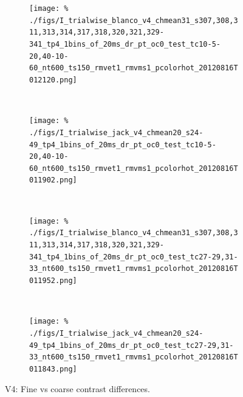 
\begin{figure}[htbp]
    \begin{subfigure}[b]{0.5\linewidth}
        \centering
        \caption{}
        \label{fig:b4-1x20cc}
        \texttt{[image: \%
./figs/I\_trialwise\_blanco\_v4\_chmean31\_s307,308,311,313,314,317,318,320,321,329-341\_tp4\_1bins\_of\_20ms\_dr\_pt\_oc0\_test\_tc10-5-20,40-10-60\_nt600\_ts150\_rmvet1\_rmvms1\_pcolorhot\_20120816T012120.png]}
    \end{subfigure}
    ~~
    \begin{subfigure}[b]{0.5\linewidth}
        \centering
        \caption{}
        \label{fig:j4-1x20cc}
        \texttt{[image: \%
./figs/I\_trialwise\_jack\_v4\_chmean20\_s24-49\_tp4\_1bins\_of\_20ms\_dr\_pt\_oc0\_test\_tc10-5-20,40-10-60\_nt600\_ts150\_rmvet1\_rmvms1\_pcolorhot\_20120816T011902.png]}
    \end{subfigure}
    \\
    \begin{subfigure}[b]{0.5\linewidth}
        \centering
        \caption{}
        \label{fig:b4-1x20fc}
        \texttt{[image: \%
./figs/I\_trialwise\_blanco\_v4\_chmean31\_s307,308,311,313,314,317,318,320,321,329-341\_tp4\_1bins\_of\_20ms\_dr\_pt\_oc0\_test\_tc27-29,31-33\_nt600\_ts150\_rmvet1\_rmvms1\_pcolorhot\_20120816T011952.png]}
    \end{subfigure}
    ~~
    \begin{subfigure}[b]{0.5\linewidth}
        \centering
        \caption{}
        \label{fig:j4-1x20fc}
        \texttt{[image: \%
./figs/I\_trialwise\_jack\_v4\_chmean20\_s24-49\_tp4\_1bins\_of\_20ms\_dr\_pt\_oc0\_test\_tc27-29,31-33\_nt600\_ts150\_rmvet1\_rmvms1\_pcolorhot\_20120816T011843.png]}
    \end{subfigure}
    \caption{V4: Fine vs coarse contrast differences.
}
\end{figure}
